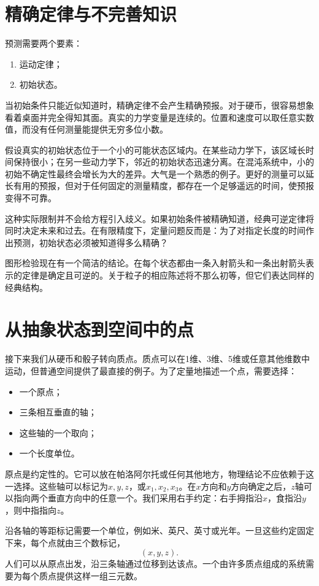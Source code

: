 \section{精确定律与不完善知识}

预测需要两个要素：
\begin{enumerate}
  \item 运动定律；
  \item 初始状态。
\end{enumerate}
当初始条件只能近似知道时，精确定律不会产生精确预报。对于硬币，很容易想象看着桌面并完全得知其面。真实的力学变量是连续的。位置和速度可以取任意实数值，而没有任何测量能提供无穷多位小数。

假设真实的初始状态位于一个小的可能状态区域内。在某些动力学下，该区域长时间保持很小；在另一些动力学下，邻近的初始状态迅速分离。在混沌系统中，小的初始不确定性最终会增长为大的差异。大气是一个熟悉的例子。更好的测量可以延长有用的预报，但对于任何固定的测量精度，都存在一个足够遥远的时间，使预报变得不可靠。

这种实际限制并不会给方程引入歧义。如果初始条件被精确知道，经典可逆定律将同时决定未来和过去。在有限精度下，定量问题反而是：为了对指定长度的时间作出预测，初始状态必须被知道得多么精确？

图形检验现在有一个简洁的结论。在每个状态都由一条入射箭头和一条出射箭头表示的定律是确定且可逆的。关于粒子的相应陈述将不那么初等，但它们表达同样的经典结构。

\section{从抽象状态到空间中的点}

接下来我们从硬币和骰子转向质点。质点可以在1维、3维、5维或任意其他维数中运动，但普通空间提供了最直接的例子。为了定量地描述一个点，需要选择：
\begin{itemize}
  \item 一个原点；
  \item 三条相互垂直的轴；
  \item 这些轴的一个取向；
  \item 一个长度单位。
\end{itemize}
原点是约定性的。它可以放在帕洛阿尔托或任何其他地方，物理结论不应依赖于这一选择。这些轴可以标记为\(x,y,z\)，或\(x_1,x_2,x_3\)。在\(x\)方向和\(y\)方向确定之后，\(z\)轴可以指向两个垂直方向中的任意一个。我们采用右手约定：右手拇指沿\(x\)，食指沿\(y\)，则中指指向\(z\)。

沿各轴的等距标记需要一个单位，例如米、英尺、英寸或光年。一旦这些约定固定下来，每个点就由三个数标记，
\begin{equation}
  (x,y,z).
\end{equation}
人们可以从原点出发，沿三条轴通过位移到达该点。一个由许多质点组成的系统需要为每个质点提供这样一组三元数。

